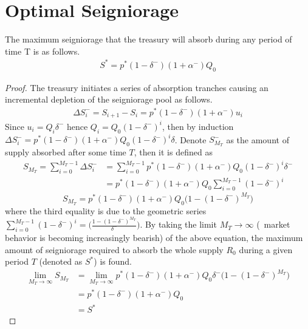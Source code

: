 \section{Optimal Seigniorage}
\begin{lemma} \label{lemma:Smax}
The maximum seigniorage that the treasury will absorb during any period of time T is as follows.
\begin{align*}
S^* = p^*(1-\delta^-)(1+\alpha^-)Q_0
\end{align*}
\end{lemma}
%
\begin{proof}
The treasury initiates a series of absorption tranches causing an incremental depletion of the seigniorage pool as follows.
%
\begin{align*}
\Delta S_i^- = S_{i+1} - S_i = p^*(1-\delta^-)(1+\alpha^-)u_i 
\end{align*}
%
Since $u_i = Q_i \delta^-$ hence $Q_i = Q_0(1-\delta^-)^i$, then by induction $\Delta S_i^- = p^*(1-\delta^-)(1+\alpha^-)Q_0(1-\delta^-)^i \delta$. Denote $S_{M_T}^-$ as the amount of supply absorbed after some time $T$, then it is defined as
%
 \begin{align*}
S_{M_T} = \sum_{i=0}^{M_T - 1} \Delta S^-_i & = \sum_{i=0}^{M_T - 1} p^*(1-\delta^-)(1+\alpha^-)Q_0(1-\delta^-)^i\delta^- \\
& = p^*(1-\delta^-)(1+\alpha^-)Q_0\sum_{i=0}^{M_T - 1}(1-\delta^-)^i
\end{align*}
\begin{equation} \label{eq:Sdeplete}
S_{M_T} = p^*(1-\delta^-)(1+\alpha^-)Q_0\big( 1 - (1-\delta^-)^{M_T} \big)
\end{equation}
%
where the third equality is due to the geometric series $\sum_{i=0}^{M_T - 1}(1-\delta^-)^i = \big( \frac{1 - (1-\delta^-)^{M_T}}{\delta^-}\big)$. By taking the limit $M_T \rightarrow \infty$ (\ie\ market behavior is becoming increasingly bearish) of the above equation, the maximum amount of seigniorage required to absorb the whole supply $R_0$ during a given period $T$ (denoted as $S^*$) is found.
%
\begin{align*}
\lim_{M_T \to \infty} S_{M_T} & = \lim_{M_T \to \infty} p^*(1-\delta^-)(1+\alpha^-)Q_0\delta^-\big( 1 - (1-\delta^-)^{M_T} \big) \\
& = p^*(1-\delta^-)(1+\alpha^-)Q_0 \\
& = S^*
\end{align*}
\end{proof}

